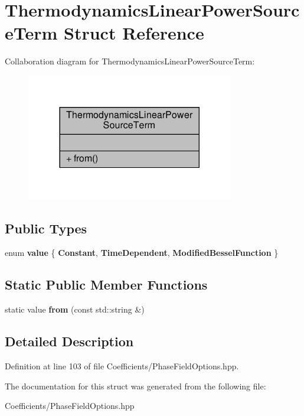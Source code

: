 \hypertarget{structThermodynamicsLinearPowerSourceTerm}{}\section{Thermodynamics\+Linear\+Power\+Source\+Term Struct Reference}
\label{structThermodynamicsLinearPowerSourceTerm}


Collaboration diagram for Thermodynamics\+Linear\+Power\+Source\+Term\+:\nopagebreak
\begin{figure}[H]
\begin{center}
\leavevmode
\includegraphics[width=257pt]{structThermodynamicsLinearPowerSourceTerm__coll__graph}
\end{center}
\end{figure}
\subsection*{Public Types}
\begin{DoxyCompactItemize}
\item 
\mbox{\label{structThermodynamicsLinearPowerSourceTerm_a64e3bec341220e11556963f483a3c576}} 
enum {\bfseries value} \{ {\bfseries Constant}, 
{\bfseries Time\+Dependent}, 
{\bfseries Modified\+Bessel\+Function}
 \}
\end{DoxyCompactItemize}
\subsection*{Static Public Member Functions}
\begin{DoxyCompactItemize}
\item 
\mbox{\label{structThermodynamicsLinearPowerSourceTerm_aff40a5353f5092aa11405518c73469e7}} 
static value {\bfseries from} (const std\+::string \&)
\end{DoxyCompactItemize}


\subsection{Detailed Description}


Definition at line 103 of file Coefficients/\+Phase\+Field\+Options.\+hpp.



The documentation for this struct was generated from the following file\+:\begin{DoxyCompactItemize}
\item 
Coefficients/\+Phase\+Field\+Options.\+hpp\end{DoxyCompactItemize}
